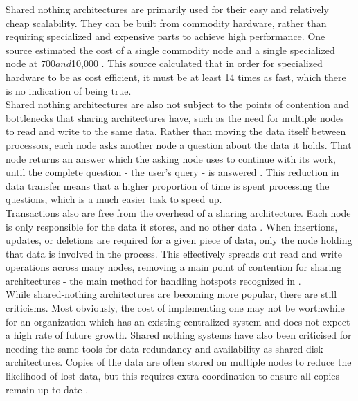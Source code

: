 \documentclass[onecolumn, draftclsnofoot,10pt, compsoc]{IEEEtran}
\begin{document}
\indent Shared nothing architectures are primarily used for their easy and relatively cheap scalability. They can be built from commodity hardware, rather than requiring specialized and expensive parts to achieve high performance. One source estimated the cost of a single commodity node and a single specialized node at $700 and $10,000 \cite{HiPerf}. This source calculated that in order for specialized hardware to be as cost efficient, it must be at least 14 times as fast, which there is no indication of being true. \\

\indent Shared nothing architectures are also not subject to the points of contention and bottlenecks that sharing architectures have, such as the need for multiple nodes to read and write to the same data. Rather than moving the data itself between processors, each node asks another node a question about the data it holds. That node returns an answer which the asking node uses to continue with its work, until the complete question - the user’s query - is answered \cite{DeWittFuture}. This reduction in data transfer means that a higher proportion of time is spent processing the questions, which is a much easier task to speed up. \\

\indent Transactions also are free from the overhead of a sharing architecture. Each node is only responsible for the data it stores, and no other data \cite{GerardPP}. When insertions, updates, or deletions are required for a given piece of data, only the node holding that data is involved in the process. This effectively spreads out read and write operations across many nodes, removing a main point of contention for sharing architectures - the main method for handling hotspots recognized in \cite{BerkeleySN}. \\

\indent While shared-nothing architectures are becoming more popular, there are still criticisms. Most obviously, the cost of implementing one may not be worthwhile for an organization which has an existing centralized system and does not expect a high rate of future growth. Shared nothing systems have also been criticised for needing the same tools for data redundancy and availability as shared disk architectures. Copies of the data are often stored on multiple nodes to reduce the likelihood of lost data, but this requires extra coordination to ensure all copies remain up to date \cite{HDFSArchitecture}. \\
\end{document}
